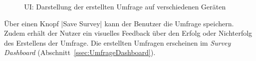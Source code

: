 \begin{figure}[!htb]
	\caption[\acl{UI}: Darstellung der erstellten Umfrage auf verschiedenen Geräten]{\label{fig:SurveyCreatorViewImplement}\acl{UI}: Darstellung der erstellten Umfrage auf verschiedenen Geräten \\ \quelleScreenshot}
\end{figure}

Über einen Knopf \jinline|Save Survey| kann der Benutzer die Umfrage speichern.
Zudem erhält der Nutzer ein visuelles Feedback über den Erfolg oder Nichterfolg des Erstellens der Umfrage.
Die erstellten Umfragen erscheinen im \emph{Survey Dashboard} (Abschnitt~\vref{ssec:UmfrageDashboard}).
